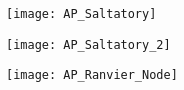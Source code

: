 
\begin{minipage}{\columnwidth/3}
    \texttt{[image: AP\_Saltatory]}
\end{minipage}%
\begin{minipage}{\columnwidth/3}
    \centering
    \texttt{[image: AP\_Saltatory\_2]}
\end{minipage}%
\begin{minipage}{\columnwidth/3}
    \hfill
    \texttt{[image: AP\_Ranvier\_Node]}
\end{minipage}
